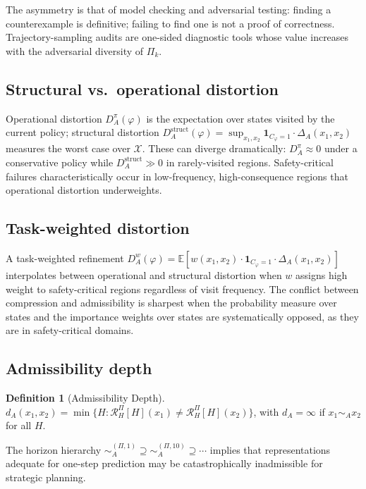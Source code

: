 \documentclass[10pt,twocolumn]{article}
\theoremstyle{plain}
\theoremstyle{definition}
\newtheorem{definition}{Definition}
\theoremstyle{remark}
\newcommand{\simA}{\sim_{\!A}}
\newcommand{\RHP}{\mathcal{R}_{H}^{\Pi}}
\newcommand{\calX}{\mathcal{X}}
\begin{document}
The asymmetry is that of model checking and adversarial testing: finding a
counterexample is definitive; failing to find one is not a proof of correctness.
Trajectory-sampling audits are one-sided diagnostic tools whose value increases
with the adversarial diversity of $\Pi_k$.

\subsection{Structural vs.\ operational distortion}

Operational distortion $D_A^\pi(\varphi)$ is the expectation over states visited
by the current policy; structural distortion $D_A^{\mathrm{struct}}(\varphi)=
\sup_{x_1,x_2}\mathbf{1}_{C_\varphi=1}\cdot\Delta_A(x_1,x_2)$ measures the
worst case over $\calX$. These can diverge dramatically: $D_A^\pi\approx 0$
under a conservative policy while $D_A^{\mathrm{struct}}\gg 0$ in rarely-visited
regions. Safety-critical failures characteristically occur in low-frequency,
high-consequence regions that operational distortion underweights.

\subsection{Task-weighted distortion}

A task-weighted refinement
$D_A^w(\varphi)=\mathbb{E}[w(x_1,x_2)\cdot\mathbf{1}_{C_\varphi=1}\cdot\Delta_A(x_1,x_2)]$
interpolates between operational and structural distortion when $w$ assigns high
weight to safety-critical regions regardless of visit frequency. The conflict
between compression and admissibility is sharpest when the probability measure
over states and the importance weights over states are systematically opposed,
as they are in safety-critical domains.

\subsection{Admissibility depth}

\begin{definition}[Admissibility Depth]
$d_A(x_1,x_2)=\min\{H:\RHP[H](x_1)\neq\RHP[H](x_2)\}$, with $d_A=\infty$
if $x_1\simA x_2$ for all $H$.
\end{definition}

The horizon hierarchy $\sim_A^{(\Pi,1)}\supseteq\sim_A^{(\Pi,10)}\supseteq\cdots$
implies that representations adequate for one-step prediction may be
catastrophically inadmissible for strategic planning.
\end{document}
